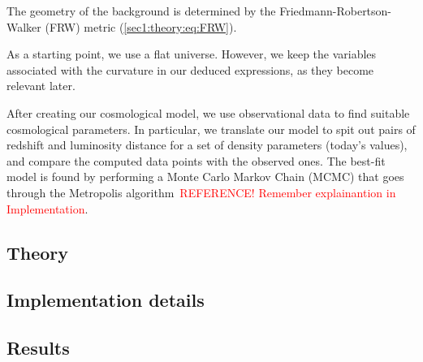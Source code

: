 

The geometry of the background is determined by the Friedmann-Robertson-Walker (FRW) metric (\cref{sec1:theory:eq:FRW}).


As a starting point, we use a flat universe. However, we keep the variables associated with the curvature in our deduced expressions, as they become relevant later. 

After creating our cosmological model, we use observational data \citep{2014A&A...568A..22B} to find suitable cosmological parameters. In particular, we translate our model to spit out pairs of redshift and luminosity distance for a set of density parameters (today's values), and compare the computed data points with the observed ones. The best-fit model is found by performing a Monte Carlo Markov Chain (MCMC) that goes through the Metropolis algorithm \textcolor{red}{REFERENCE! Remember explainantion in Implementation}. 

\subsection{Theory}


\subsection{Implementation details}


\subsection{Results}
